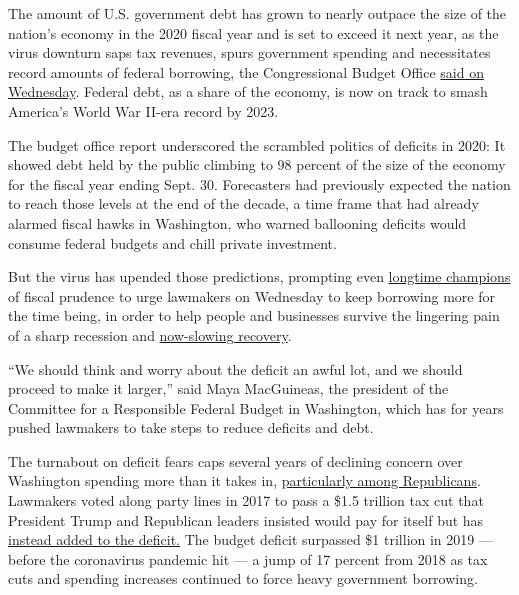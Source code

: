The amount of U.S. government debt has grown to nearly outpace the size
of the nation's economy in the 2020 fiscal year and is set to exceed it
next year, as the virus downturn saps tax revenues, spurs government
spending and necessitates record amounts of federal borrowing, the
Congressional Budget Office
\href{https://www.cbo.gov/system/files/2020-09/56517-Budget-Outlook.pdf}{said
on Wednesday}. Federal debt, as a share of the economy, is now on track
to smash America's World War II-era record by 2023.

The budget office report underscored the scrambled politics of deficits
in 2020: It showed debt held by the public climbing to 98 percent of the
size of the economy for the fiscal year ending Sept. 30. Forecasters had
previously expected the nation to reach those levels at the end of the
decade, a time frame that had already alarmed fiscal hawks in
Washington, who warned ballooning deficits would consume federal budgets
and chill private investment.

But the virus has upended those predictions, prompting even
\href{https://www.nytimes3xbfgragh.onion/2020/05/16/business/deficits-virus-economists-trump.html}{longtime
champions} of fiscal prudence to urge lawmakers on Wednesday to keep
borrowing more for the time being, in order to help people and
businesses survive the lingering pain of a sharp recession and
\href{https://www.nytimes3xbfgragh.onion/2020/08/21/business/economy/coronavirus-economic-recovery.html}{now-slowing
recovery}.

``We should think and worry about the deficit an awful lot, and we
should proceed to make it larger,'' said Maya MacGuineas, the president
of the Committee for a Responsible Federal Budget in Washington, which
has for years pushed lawmakers to take steps to reduce deficits and
debt.

The turnabout on deficit fears caps several years of declining concern
over Washington spending more than it takes in,
\href{https://www.nytimes3xbfgragh.onion/2018/02/13/us/politics/republicans-have-forgotten-they-hate-deficits.html}{particularly
among Republicans}. Lawmakers voted along party lines in 2017 to pass a
\$1.5 trillion tax cut that President Trump and Republican leaders
insisted would pay for itself but has
\href{https://www.nytimes3xbfgragh.onion/2019/01/11/business/trump-tax-cuts-revenue.html}{instead
added to the deficit.} The budget deficit surpassed \$1 trillion in 2019
--- before the coronavirus pandemic hit --- a jump of 17 percent from
2018 as tax cuts and spending increases continued to force heavy
government borrowing.


